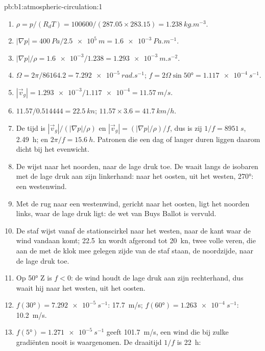 \begin{solution}{pb:b1:atmospheric-circulation:1}
\begin{enumerate}
  \item $\rho = p/(R_dT) = \num{100600}/(287.05 \times 283.15) =
        \qty{1.238}{kg.m^{-3}}$.
  \item $|\nabla p| = \qty{400}{Pa}/\qty{2.5e5}{m} = \qty{1.6e-3}{Pa.m^{-1}}$.
  \item $|\nabla p|/\rho = \num{1.6e-3}/1.238 = \qty{1.293e-3}{m.s^{-2}}$.
  \item $\Omega = 2\pi/\num{86164.2} = \qty{7.292e-5}{rad.s^{-1}}$;
        $f = 2\Omega\sin\ang{50} = \qty{1.117e-4}{s^{-1}}$.
  \item $|\vec v_g| = \num{1.293e-3}/\num{1.117e-4} = \qty{11.57}{m/s}$.
  \item $11.57/0.514444 = \qty{22.5}{kn}$; $11.57 \times 3.6 = \qty{41.7}{km/h}$.
  \item De tijd is $|\vec v_g|/(|\nabla p|/\rho)$ en $|\vec v_g| = (|\nabla
        p|/\rho)/f$, dus is zij $1/f = \qty{8951}{s}$, \qty{2.49}{h}; en $2\pi/f =
        \qty{15.6}{h}$. Patronen die een dag of langer duren liggen daarom dicht bij het evenwicht.
  \item De  wijst naar het noorden, naar de lage druk toe. De  waait langs de isobaren met de lage druk aan zijn linkerhand: naar het oosten,
        uit het westen,  \ang{270}: een westenwind.
  \item Met de rug naar een westenwind, gericht naar het oosten, ligt het noorden links,
        waar de lage druk ligt: de wet van Buys Ballot is vervuld.
  \item De staf wijst vanaf de stationscirkel naar het westen, naar de kant waar de wind
        vandaan komt; \qty{22.5}{kn} wordt afgerond tot \qty{20}{kn}, twee volle veren, die
        aan de met de klok mee gelegen zijde van de staf staan, de noordzijde, naar de lage druk toe.
  \item Op \ang{50} Z is $f < 0$: de wind houdt de lage druk aan zijn rechterhand, dus waait
        hij naar het westen, uit het oosten.
  \item $f(\ang{30}) = \qty{7.292e-5}{s^{-1}}$: \qty{17.7}{m/s}; $f(\ang{60}) =
        \qty{1.263e-4}{s^{-1}}$: \qty{10.2}{m/s}.
  \item $f(\ang{5}) = \qty{1.271e-5}{s^{-1}}$ geeft \qty{101.7}{m/s}, een wind die bij zulke gradiënten nooit is waargenomen. De draaitijd $1/f$ is \qty{22}{h}:

\end{enumerate}
\end{solution}

